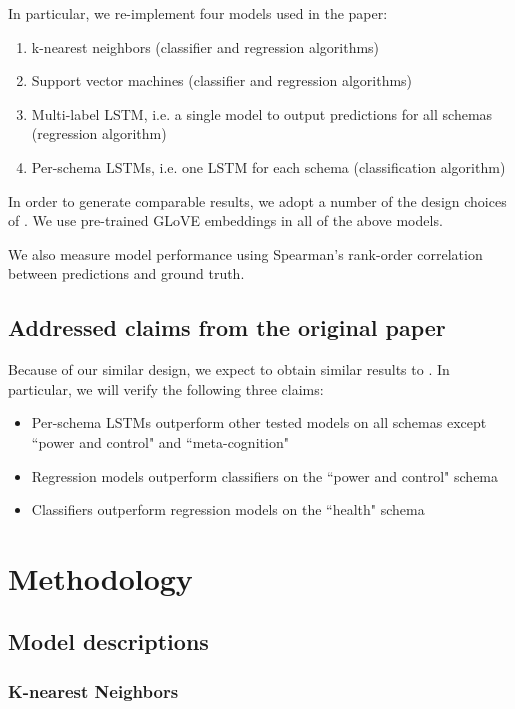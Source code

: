 \documentclass[11pt,a4paper]{article}
\begin{document}
In particular, we re-implement four models used in the paper:
\begin{enumerate}
    \item k-nearest neighbors (classifier and regression algorithms)
    \item Support vector machines (classifier and regression algorithms)
    \item Multi-label LSTM, i.e. a single model to output predictions for all schemas (regression algorithm)
    \item Per-schema LSTMs, i.e. one LSTM for each schema (classification algorithm)
\end{enumerate}

In order to generate comparable results, we adopt a number of the design choices of \citeauthor{burger_2021}. We use pre-trained GLoVE embeddings \citep{pennington_2014} in all of the above models. 

We also measure model performance using Spearman's rank-order correlation between predictions and ground truth. 

\subsection{Addressed claims from the original paper}
Because of our similar design, we expect to obtain similar results to \citeauthor{burger_2021}. In particular, we will verify the following three claims:
\begin{itemize}
    \item Per-schema LSTMs outperform other tested models on all schemas except ``power and control" and ``meta-cognition"
    \item Regression models outperform classifiers on the ``power and control" schema
    \item Classifiers outperform regression models on the ``health" schema
\end{itemize}

\section{Methodology}
\subsection{Model descriptions}
\subsubsection{K-nearest Neighbors}
\end{document}
